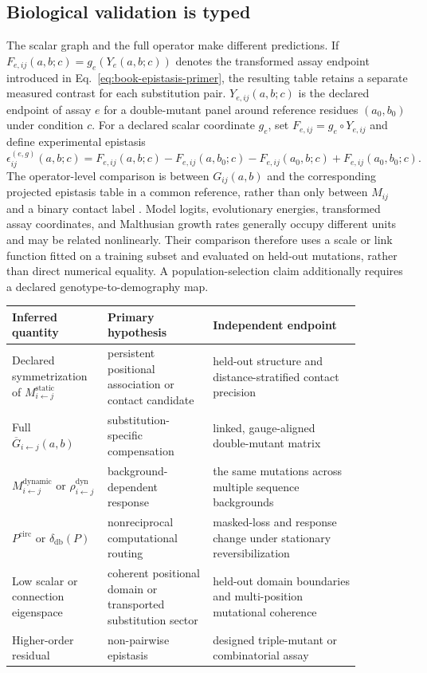 \documentclass[10pt]{article}
\theoremstyle{definition}
\theoremstyle{remark}
\newcommand{\BookInsert}[1]{}
\newcommand{\BookSection}[1]{\subsection{#1}}
\begin{document}
\BookInsert{chapters/12_statistical_mechanics_falsification}

\BookSection{Biological validation is typed}

The scalar graph and the full operator make different predictions.  If
\ifdefined\BOOKMODE
 $F_{e,ij}(a,b;c)=g_e(Y_e(a,b;c))$ denotes the transformed assay endpoint introduced in
Eq.~\ref{eq:book-epistasis-primer}, the resulting table retains a separate measured contrast for
each substitution pair.
\else
$Y_{e,ij}(a,b;c)$ is the declared endpoint of assay $e$ for a double-mutant panel around reference
residues $(a_0,b_0)$ under condition $c$.  For a declared scalar coordinate $g_e$, set
$F_{e,ij}=g_e\circ Y_{e,ij}$ and define experimental epistasis
\begin{equation}
\epsilon_{ij}^{(e,g)}(a,b;c)
=F_{e,ij}(a,b;c)-F_{e,ij}(a,b_0;c)-F_{e,ij}(a_0,b;c)+F_{e,ij}(a_0,b_0;c).
\label{eq:experimental-epistasis}
\end{equation}
\fi
The operator-level comparison is between $G_{ij}(a,b)$ and the corresponding projected epistasis
table in a common reference, rather than only between $M_{ij}$ and a binary contact label
\cite{hopf2017,olson2014}.
Model logits, evolutionary energies, transformed assay coordinates, and Malthusian growth rates
generally occupy different units and may be related nonlinearly.  Their comparison therefore uses a
scale or link function fitted on a training subset and evaluated on held-out mutations, rather than
direct numerical equality.  A population-selection claim additionally requires a declared
genotype-to-demography map.

\begin{center}
\small
\begin{tabular}{>{\raggedright\arraybackslash}p{0.22\linewidth}
                >{\raggedright\arraybackslash}p{0.27\linewidth}
                >{\raggedright\arraybackslash}p{0.38\linewidth}}
\toprule
Inferred quantity & Primary hypothesis & Independent endpoint \\
\midrule
Declared symmetrization of $M_{i\leftarrow j}^{\mathrm{static}}$ & persistent positional association or contact candidate & held-out structure and distance-stratified contact precision \\
Full $\overline G_{i\leftarrow j}(a,b)$ & substitution-specific compensation & linked, gauge-aligned double-mutant matrix \\
$M_{i\leftarrow j}^{\mathrm{dynamic}}$ or $\rho_{i\leftarrow j}^{\mathrm{dyn}}$ & background-dependent response & the same mutations across multiple sequence backgrounds \\
$P^{\mathrm{circ}}$ or $\delta_{\mathrm{db}}(P)$ & nonreciprocal computational routing & masked-loss and response change under stationary reversibilization \\
Low scalar or connection eigenspace & coherent positional domain or transported substitution sector & held-out domain boundaries and multi-position mutational coherence \\
Higher-order residual & non-pairwise epistasis & designed triple-mutant or combinatorial assay \\
\bottomrule
\end{tabular}
\end{center}
\end{document}
